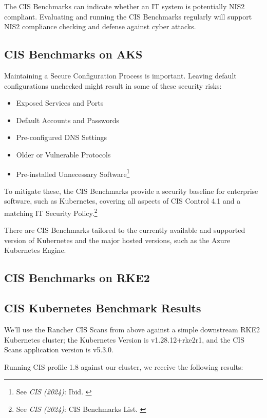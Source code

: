 The CIS Benchmarks can indicate whether an IT system is potentially NIS2 compliant. Evaluating and running the CIS Benchmarks regularly will support NIS2 compliance checking and defense against cyber attacks.

\subsection{CIS Benchmarks on AKS}

Maintaining a Secure Configuration Process is important. Leaving default configurations unchecked might result in some of these security risks:

\begin{itemize}
    \item Exposed Services and Ports
    \item Default Accounts and Passwords
    \item Pre-configured DNS Settings
    \item Older or Vulnerable Protocols
    \item Pre-installed Unnecessary Software\footnote{See \textit{CIS (2024)}: Ibid. \cite{cisControls}}
\end{itemize}

To mitigate these, the CIS Benchmarks provide a security baseline for enterprise software, such as Kubernetes, covering all aspects of CIS Control 4.1 and a matching IT Security Policy.\footnote{See \textit{CIS (2024)}: CIS Benchmarks List. \cite{cisBenchmarks}}

There are CIS Benchmarks tailored to the currently available and supported version of Kubernetes and the major hosted versions, such as the Azure Kubernetes Engine.

\subsection{CIS Benchmarks on RKE2}

\subsection{CIS Kubernetes Benchmark Results}

We'll use the Rancher CIS Scans from above against a simple downstream RKE2 Kubernetes cluster; the Kubernetes Version is v1.28.12+rke2r1, and the CIS Scans application version is v5.3.0.

Running CIS profile 1.8 against our cluster, we receive the following results:

